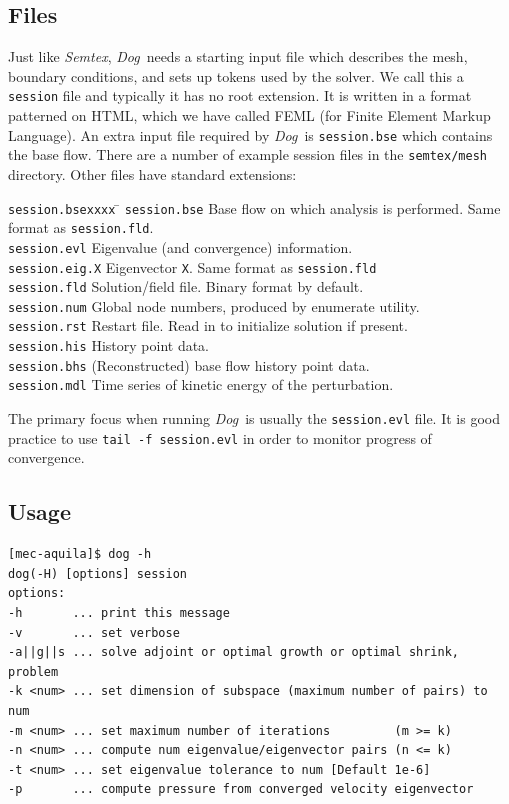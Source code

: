 \documentclass[11pt,a4paper]{report}
\newcommand{\Semtex}{\emph{Semtex}}
\newcommand{\Dog}{\emph{Dog}}
\begin{document}
\subsection{Files}

Just like \Semtex, \Dog\ needs a starting input file which describes
the mesh, boundary conditions, and sets up tokens used by the solver.
We call this a \verb+session+ file and typically it has no root
extension.  It is written in a format patterned on HTML, which we have
called FEML (for Finite Element Markup Language). An extra input file
required by \Dog\ is \verb+session.bse+ which contains the base
flow. There are a number of example session files in the
\verb+semtex/mesh+ directory.  Other files have standard extensions:
\begin{tabbing}
\texttt{session.bsexxxx} \= \kill 
%
\texttt{session.bse}  \>
        Base flow on which analysis is performed.  Same format as
        \texttt{session.fld}.\\
\texttt{session.evl} \> Eigenvalue (and convergence) information.\\
\texttt{session.eig.X} \> Eigenvector \texttt{X}. 
     Same format as \texttt{session.fld}\\
\texttt{session.fld}  \>
        Solution/field file.  Binary format by default.\\
\texttt{session.num}  \>
        Global node numbers, produced by enumerate utility.\\
\texttt{session.rst}  \>
        Restart file. Read in to initialize solution if present.\\
\texttt{session.his} \> History point data.\\
\texttt{session.bhs} \> (Reconstructed) base flow history point data.\\
\texttt{session.mdl} \> Time series of kinetic energy of the perturbation.
\end{tabbing}
The primary focus when running \Dog\ is usually the \verb+session.evl+
file. It is good practice to use \verb+tail -f session.evl+ in order
to monitor progress of convergence.


\subsection{Usage}

{\small
\begin{verbatim}
[mec-aquila]$ dog -h
dog(-H) [options] session
options:
-h       ... print this message
-v       ... set verbose
-a||g||s ... solve adjoint or optimal growth or optimal shrink, problem
-k <num> ... set dimension of subspace (maximum number of pairs) to num
-m <num> ... set maximum number of iterations         (m >= k)
-n <num> ... compute num eigenvalue/eigenvector pairs (n <= k)
-t <num> ... set eigenvalue tolerance to num [Default 1e-6]
-p       ... compute pressure from converged velocity eigenvector
\end{verbatim}
}
\end{document}

